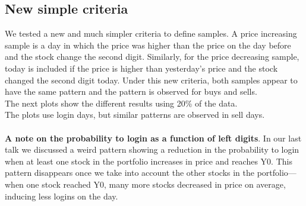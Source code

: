 \documentclass[
	USenglish,12pt,paper=a4,numbers=noenddot,abstract=on,
	final,%
	fullsample,
    ]{scrartcl}
\begin{document}
\subsection{New simple criteria}
We tested a new and much simpler criteria to define samples. A price increasing sample is a day in which the price was higher than the price on the day before and the stock change the second digit. Similarly, for the price decreasing sample, today is included if the price is higher than yesterday's price and the stock changed the second digit today. Under this new criteria, both samples appear to have the same pattern and the pattern is observed for buys and sells.  \\
The next plots show the different results using 20\% of the data. \\
The plots use login days, but similar patterns are observed in sell days. \\ \\
\textbf{A note on the probability to login as a function of left digits}.
In our last talk we discussed a weird pattern showing a reduction in the probability to login when at least one stock in the portfolio increases in price and reaches Y0. This pattern disappears once we take into account the other stocks in the portfolio---when one stock reached Y0, many more stocks decreased in price on average, inducing less logins on the day.
\end{document}
